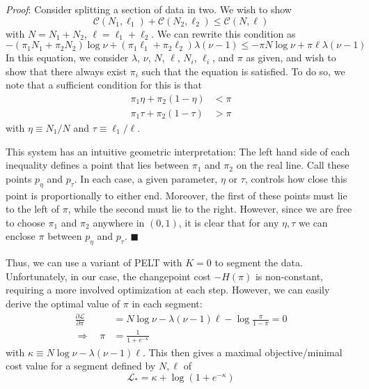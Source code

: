 \documentclass[11pt]{article}
\begin{document}
\emph{Proof}: Consider splitting a section of data in two. We wish to show
\begin{equation}
    \mathcal{C}(N_1, \ell_1) + \mathcal{C}(N_2, \ell_2) \le \mathcal{C}(N, \ell)
\end{equation}
with $N = N_1 + N_2$, $\ell = \ell_1 + \ell_2$. We can rewrite this condition as
\begin{equation}
    -(\pi_1 N_1 + \pi_2 N_2) \log \nu + (\pi_1 \ell_1 + \pi_2 \ell_2) \lambda (\nu - 1)
    \le
    -\pi N \log \nu + \pi \ell \lambda (\nu - 1)
\end{equation}
In this equation, we consider $\lambda$, $\nu$, $N$, $\ell$, $N_i$, $\ell_i$, and $\pi$ as given, and wish to show that there always exist $\pi_i$ such that the equation is satisfied. To do so, we note that a sufficient condition for this is that
\begin{align}
    \pi_1 \eta + \pi_2 (1 - \eta) &< \pi \\
    \pi_1 \tau + \pi_2 (1 - \tau) &> \pi
\end{align}
with $\eta \equiv N_1/N$ and $\tau \equiv \ell_1/\ell$. 

This system has an intuitive geometric interpretation: The left hand side of each inequality defines a point that lies between $\pi_1$ and $\pi_2$ on the real line. Call these points $p_\eta$ and $p_\tau$. In each case, a given parameter, $\eta$ or $\tau$, controls how close this point is proportionally to either end. Moreover, the first of these points must lie to the left of $\pi$, while the second must lie to the right. However, since we are free to choose $\pi_1$ and $\pi_2$ anywhere in $(0, 1)$, it is clear that for any $\eta, \tau$ we can enclose $\pi$ between $p_\eta$ and $p_\tau$. $\blacksquare$

Thus, we can use a variant of PELT with $K = 0$ to segment the data. Unfortunately, in our case, the changepoint cost $-H(\pi)$ is non-constant, requiring a more involved optimization at each step. However, we can easily derive the optimal value of $\pi$ in each segment:
\begin{align}
    \frac{\partial \mathcal{L}}{\partial \pi} &= N\log \nu - \lambda (\nu - 1)\ell - \log \frac{\pi}{1-\pi} = 0 \\
    \Rightarrow \quad \pi &= \frac{1}{1 + e^{-\kappa}} 
\end{align}
with $\kappa \equiv N\log \nu - \lambda (\nu - 1)\ell$. This then gives a maximal objective/minimal cost value for a segment defined by $N, \ell$ of
\begin{equation}
    \mathcal{L}_* = \kappa + \log (1 + e^{-\kappa})
\end{equation}
\end{document}
